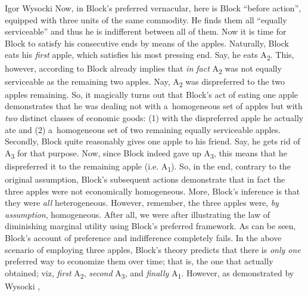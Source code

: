 \begin{artengenv}{Igor Wysocki}
Now, in Block's preferred vernacular, here is Block ``before action'', equipped with three units of the same commodity. He finds them all ``equally serviceable'' and thus he is indifferent between all of them. Now it is time for Block to satisfy his consecutive ends by means of the apples. Naturally, Block eats his \textit{first} apple, which satisfies his most pressing end. Say, he eats A\textsubscript{2}. This, however, according to Block already implies that \textit{in fact} A\textsubscript{2} was not equally serviceable as the remaining two apples. Nay, A\textsubscript{2} was dispreferred to the two apples remaining. So, it magically turns out that Block's act of eating one apple demonstrates that he was dealing not with a~homogeneous set of apples but with \textit{two} distinct classes of economic goods: (1) with the dispreferred apple he actually ate and (2) a~homogeneous set of two remaining equally serviceable apples. Secondly, Block quite reasonably gives one apple to his friend. Say, he gets rid of A\textsubscript{3} for that purpose. Now, since Block indeed gave up A\textsubscript{3}, this means that he dispreferred it to the remaining apple (i.e. A\textsubscript{1}). So, in the end, contrary to the original assumption, Block's subsequent actions demonstrate that in fact the three apples were not economically homogeneous. More, Block's inference is that they were \textit{all} heterogeneous. However, remember, the three apples were, \textit{by assumption}, homogeneous. After all, we were after illustrating the law of diminishing marginal utility using Block's preferred framework. As can be seen, Block's account of preference and indifference completely fails. In the above scenario of employing three apples, Block's theory predicts that there is \textit{only one} preferred way to economize them over time; that is, the one that actually obtained; viz, \textit{first} A\textsubscript{2}, \textit{second} A\textsubscript{3}, and \textit{finally} A\textsubscript{1}. However, as demonstrated by Wysocki 
\parencite*[][p.41]{wysocki_problem_2021}, %

\end{artengenv}
